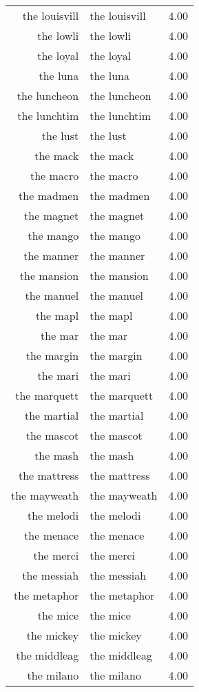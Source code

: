 \begin{table}[ht]
\begin{tabular}{rlr}
  the louisvill & the louisvill & 4.00 \\ 
  the lowli & the lowli & 4.00 \\ 
  the loyal & the loyal & 4.00 \\ 
  the luna & the luna & 4.00 \\ 
  the luncheon & the luncheon & 4.00 \\ 
  the lunchtim & the lunchtim & 4.00 \\ 
  the lust & the lust & 4.00 \\ 
  the mack & the mack & 4.00 \\ 
  the macro & the macro & 4.00 \\ 
  the madmen & the madmen & 4.00 \\ 
  the magnet & the magnet & 4.00 \\ 
  the mango & the mango & 4.00 \\ 
  the manner & the manner & 4.00 \\ 
  the mansion & the mansion & 4.00 \\ 
  the manuel & the manuel & 4.00 \\ 
  the mapl & the mapl & 4.00 \\ 
  the mar & the mar & 4.00 \\ 
  the margin & the margin & 4.00 \\ 
  the mari & the mari & 4.00 \\ 
  the marquett & the marquett & 4.00 \\ 
  the martial & the martial & 4.00 \\ 
  the mascot & the mascot & 4.00 \\ 
  the mash & the mash & 4.00 \\ 
  the mattress & the mattress & 4.00 \\ 
  the mayweath & the mayweath & 4.00 \\ 
  the melodi & the melodi & 4.00 \\ 
  the menace & the menace & 4.00 \\ 
  the merci & the merci & 4.00 \\ 
  the messiah & the messiah & 4.00 \\ 
  the metaphor & the metaphor & 4.00 \\ 
  the mice & the mice & 4.00 \\ 
  the mickey & the mickey & 4.00 \\ 
  the middleag & the middleag & 4.00 \\ 
  the milano & the milano & 4.00 \\ 

\end{tabular}
\end{table}
